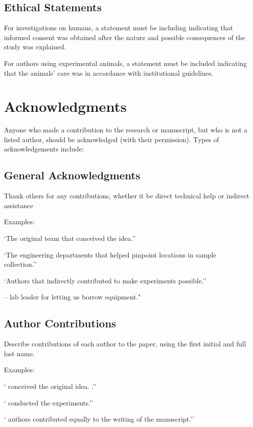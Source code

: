 \documentclass{article}
\begin{document}
	\subsection{Ethical Statements}
	For investigations on humans, a statement must be including indicating that informed consent was obtained after the nature and possible consequences of the study was explained.
	
	For authors using experimental animals, a statement must be included indicating that the animals’ care was in accordance with institutional guidelines.
	
	\section*{Acknowledgments}
	Anyone who made a contribution to the research or manuscript, but who is not a listed author, should be acknowledged (with their permission). Types of acknowledgements include:
	
	\subsection*{General Acknowledgments} 
	Thank others for any contributions, whether it be direct technical help or indirect assistance
	
	\medskip Examples:
	
	`The original team that conceived the idea.''
	
	`The engineering departments that helped pinpoint locations in sample collection.''
	
	`Authors that indirectly contributed to make experiments possible.'' 
	
	--\underline{\hspace{5cm}} lab leader for letting us borrow equipment."	
	\subsection*{Author Contributions} 
	Describe contributions of each author to the paper, using the first initial and full last name. 
	
	\medskip Examples:
	
	`\underline{\hspace{5cm}} conceived the original idea.
	.''
	
	`\underline{\hspace{5cm}} conducted the experiments.''
	
	`\underline{\hspace{5cm}} authors contributed equally to the writing of the manuscript.''
	
\end{document}
